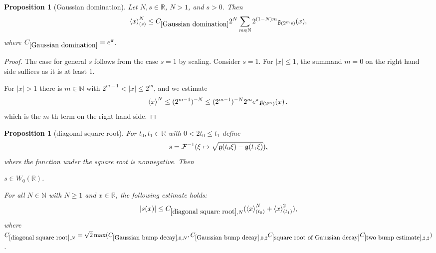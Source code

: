 \documentclass[12pt,reqno]{amsart}
\theoremstyle{plain}
\newtheorem{proposition}[theorem]{Proposition}
\numberwithin{equation}{section}
\theoremstyle{remark}
\newcommand{\uses}[1]{}
\newcommand{\usesdefs}[1]{}
\newcommand{\R}{{\mathbb R}}
\newcommand{\N}{{\mathbb N}}
\begin{document}
\begin{proposition}[Gaussian domination]\label{Gaussian domination}\uses{}\usesdefs{gaussian,bracket bump}
    Let
    $N,s\in\R$, $N>1$, and $s>0$. Then
\begin{equation}\label{auto:bracket-Gaussian-domination}
    \left< x\right>^{N}_{(s)}  \le C_{\ref{Gaussian domination}} 2^N   \sum_{m\in {\N}}  2^{(1-N)m} \g_{(2^ms)}(x),
\end{equation}
where $C_{\ref{Gaussian domination}}=e^\pi$.
\end{proposition}
 \begin{proof}
     The case for general $s$ follows from the case $s=1$ by scaling.  Consider $s=1$. For $|x|\le 1$, the summand $m=0$ on the right hand side suffices as it is at least $1$.

     For $|x|>1$ there is $m\in \N$ with $2^{m-1}<|x|\le 2^{m}$, and we estimate
     \begin{equation}
          \left< x\right>^{N}\le (2^{m-1})^{-N} \le (2^{m-1})^{-N} 2^me^\pi \mathfrak{g}_{(2^m)}(x)\, . \,
     \end{equation}
     which is the $m$-th term on the right hand side.
 \end{proof}


\begin{proposition}[diagonal square root]\label{diagonal square root}\uses{square root of Gaussian decay,Gaussian bump decay,two bump estimate}\usesdefs{gaussian,bracket bump,auto:Wiener-space-definition}
For $t_0,t_1\in\R$ with $0<2t_0\le t_1$ define
\begin{equation}\label{auto:diagonal-square-root-definition} s = \mathcal{F}^{-1}(\xi\mapsto \sqrt{\mathfrak{g}(t_0 \xi)- \mathfrak{g}(t_1 \xi)}), \end{equation}
where the function under the square root is nonnegative. Then

$s\in W_0(\R)$.


For all $N\in \mathbb N$ with $N\geq 1$ and $x\in \R$, the following estimate holds:
\begin{equation}\label{E:s-estimate}
    |s(x)|\le  C_{\ref{diagonal square root},N} ( \left<x\right>^N_{(t_0)}+ \left<x\right>^2_{(t_1)}),
\end{equation}
where
$C_{\ref{diagonal square root},N}=\sqrt{2}\max(C_{\ref{Gaussian bump decay},0,N}, C_{\ref{Gaussian bump decay},0,2}C_{\ref{square root of Gaussian decay}}C_{\ref{two bump estimate},2,2})$.

\end{proposition}
\end{document}
